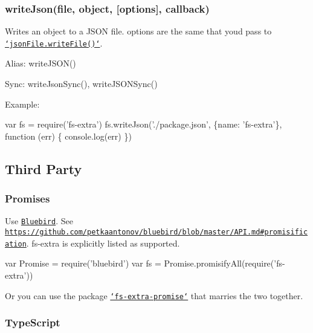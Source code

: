 \subsubsection*{write\+Json(file, object, \mbox{[}options\mbox{]}, callback)}

Writes an object to a J\+S\+O\+N file. {\ttfamily options} are the same that you\textquotesingle{}d pass to \href{https://github.com/jprichardson/node-jsonfile#writefilefilename-options-callback}{\tt `json\+File.write\+File()`}.

Alias\+: {\ttfamily write\+J\+S\+O\+N()}

Sync\+: {\ttfamily write\+Json\+Sync()}, {\ttfamily write\+J\+S\+O\+N\+Sync()}

Example\+:


\begin{DoxyCode}
var fs = require(\textcolor{stringliteral}{'fs-extra'})
fs.writeJson('./package.json', \{name: \textcolor{stringliteral}{'fs-extra'}\}, \textcolor{keyword}{function} (err) \{
  console.log(err)
\})
\end{DoxyCode}


\subsection*{Third Party }

\subsubsection*{Promises}

Use \href{https://github.com/petkaantonov/bluebird}{\tt Bluebird}. See \href{https://github.com/petkaantonov/bluebird/blob/master/API.md#promisification}{\tt https\+://github.\+com/petkaantonov/bluebird/blob/master/\+A\+P\+I.\+md\#promisification}. {\ttfamily fs-\/extra} is explicitly listed as supported.


\begin{DoxyCode}
var Promise = require(\textcolor{stringliteral}{'bluebird'})
var fs = Promise.promisifyAll(require('fs-extra'))
\end{DoxyCode}


Or you can use the package \href{https://github.com/overlookmotel/fs-extra-promise}{\tt `fs-\/extra-\/promise`} that marries the two together.

\subsubsection*{Type\+Script}


